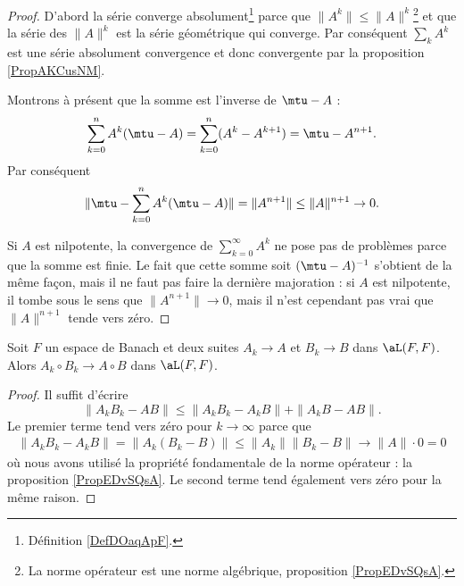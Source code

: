 \begin{proof}
    D'abord la série converge absolument\footnote{Définition \ref{DefDOaqApF}.} parce que \( \| A^k \|\leq \| A \|^k\)\footnote{La norme opérateur est une norme algébrique, proposition \ref{PropEDvSQsA}.} et que la série des \( \| A \|^k\) est la série géométrique qui converge. Par conséquent \( \sum_{k}A^k\) est une série absolument convergence et donc convergente par la proposition \ref{PropAKCusNM}.
    
    Montrons à présent que la somme est l'inverse de \( \mtu-A\) :
    \begin{equation}
        \sum_{k=0}^nA^k(\mtu-A)=\sum_{k=0}^n(A^k-A^{k+1})=\mtu-A^{n+1}.
    \end{equation}
    Par conséquent 
    \begin{equation}
        \| \mtu-\sum_{k=0}^nA^k(\mtu-A) \|=\| A^{n+1} \|\leq \| A \|^{n+1}\to 0.
    \end{equation}

    Si \( A\) est nilpotente, la convergence de \( \sum_{k=0}^{\infty}A^k\) ne pose pas de problèmes parce que la somme est finie. Le fait que cette somme soit \( (\mtu-A)^{-1}\) s'obtient de la même façon, mais il ne faut pas faire la dernière majoration : si \( A\) est nilpotente, il tombe sous le sens que \( \| A^{n+1} \|\to 0\), mais il n'est cependant pas vrai que \( \| A \|^{n+1}\) tende vers zéro.
\end{proof}

\begin{lemma}   \label{LemWWXVSae}
Soit \( F\) un espace de Banach et deux suites \( A_k\to A\) et \( B_k\to B\) dans \( \aL(F,F)\). Alors \( A_k\circ B_k\to A\circ B\) dans \( \aL(F,F)\).
\end{lemma}

\begin{proof}
    Il suffit d'écrire
    \begin{equation}
        \| A_kB_k-AB \|\leq \| A_kB_k-A_kB \|+\| A_kB-AB \|.
    \end{equation}
    Le premier terme tend vers zéro pour \( k\to\infty\) parce que 
    \begin{subequations}
        \begin{align}
            \| A_kB_k-A_kB \|=\| A_k(B_k-B) \|\leq \| A_k \|\| B_k-B \|\to \| A \|\cdot 0=0
        \end{align}
    \end{subequations}
    où nous avons utilisé la propriété fondamentale de la norme opérateur : la proposition \ref{PropEDvSQsA}. Le second terme tend également vers zéro pour la même raison.
\end{proof}

